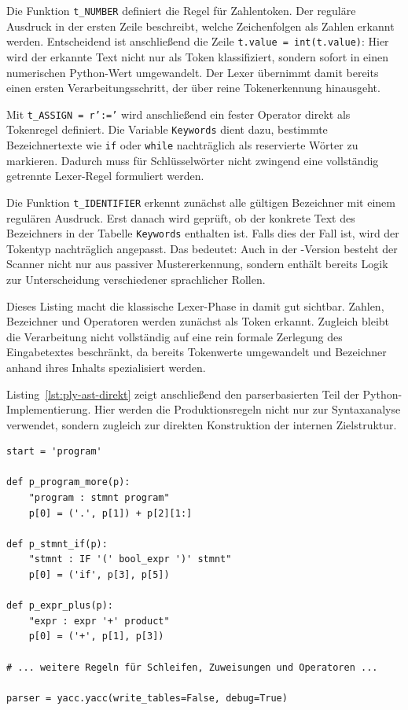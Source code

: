 Die Funktion \texttt{t\_NUMBER} definiert die Regel für Zahlentoken. Der reguläre Ausdruck in der ersten Zeile beschreibt, welche Zeichenfolgen als Zahlen erkannt werden. Entscheidend ist anschließend die Zeile \texttt{t.value = int(t.value)}: Hier wird der erkannte Text nicht nur als Token klassifiziert, sondern sofort in einen numerischen Python-Wert umgewandelt. Der Lexer übernimmt damit bereits einen ersten Verarbeitungsschritt, der über reine Tokenerkennung hinausgeht.

Mit \texttt{t\_ASSIGN = r':='} wird anschließend ein fester Operator direkt als Tokenregel definiert. Die Variable \texttt{Keywords} dient dazu, bestimmte Bezeichnertexte wie \texttt{if} oder \texttt{while} nachträglich als reservierte Wörter zu markieren. Dadurch muss für Schlüsselwörter nicht zwingend eine vollständig getrennte Lexer-Regel formuliert werden.

Die Funktion \texttt{t\_IDENTIFIER} erkennt zunächst alle gültigen Bezeichner mit einem regulären Ausdruck. Erst danach wird geprüft, ob der konkrete Text des Bezeichners in der Tabelle \texttt{Keywords} enthalten ist. Falls dies der Fall ist, wird der Tokentyp nachträglich angepasst. Das bedeutet: Auch in der -Version besteht der Scanner nicht nur aus passiver Mustererkennung, sondern enthält bereits Logik zur Unterscheidung verschiedener sprachlicher Rollen.

Dieses Listing macht die klassische Lexer-Phase in \emph{} damit gut sichtbar. Zahlen, Bezeichner und Operatoren werden zunächst als Token erkannt. Zugleich bleibt die Verarbeitung nicht vollständig auf eine rein formale Zerlegung des Eingabetextes beschränkt, da bereits Tokenwerte umgewandelt und Bezeichner anhand ihres Inhalts spezialisiert werden.

Listing~\ref{lst:ply-ast-direkt} zeigt anschließend den parserbasierten Teil der Python-Implemen\-tierung. Hier werden die Produktionsregeln nicht nur zur Syntaxanalyse verwendet, sondern zugleich zur direkten Konstruktion der internen Zielstruktur.

\begin{listing}[htbp]
\caption{Direkte AST-Konstruktion in PLY (Auszug)}
\label{lst:ply-ast-direkt}
\begin{verbatim}
start = 'program'

def p_program_more(p):
    "program : stmnt program"
    p[0] = ('.', p[1]) + p[2][1:]

def p_stmnt_if(p):
    "stmnt : IF '(' bool_expr ')' stmnt"
    p[0] = ('if', p[3], p[5])

def p_expr_plus(p):
    "expr : expr '+' product"
    p[0] = ('+', p[1], p[3])

# ... weitere Regeln für Schleifen, Zuweisungen und Operatoren ...

parser = yacc.yacc(write_tables=False, debug=True)
\end{verbatim}
\end{listing}

